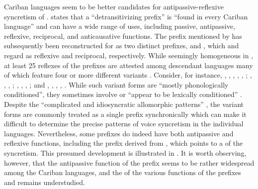 Cariban languages seem to be better candidates for antipassive-reflexive syncretism of . \cite[217ff.]{meira:2000} states that a “detransitivizing prefix” is “found in every Cariban language” and can have a wide range of uses, including passive, antipassive, reflexive, reciprocal, and anticausative functions. The prefix mentioned by \citeauthor{meira:2000} has subsequently been reconstructed for  as two distinct prefixes,  and , which \cite[512]{meira:al:2010} and \cite[9]{gildea:2015} regard as reflexive and reciprocal, respectively. While seemingly homogeneous in , at least 25 reflexes of the prefixes are attested among descendant languages many of which feature four or more different variants \citep[506]{meira:al:2010}. Consider, for instance,  , , , , , ;  , , , ;  , , , ; and  , , , ,  \citep[217f.]{meira:2000}. While such variant forms are “mostly phonologically conditioned”, they sometimes involve  \citep[2]{gildea:al:2016} or “appear to be lexically conditioned” \citep[217]{meira:2000}. Despite the “complicated and idiosyncratic allomorphic patterns” \citep[217]{meira:2000}, the variant forms are commonly treated as a single prefix synchronically which can make it difficult to determine the precise patterns of voice syncretism in the individual languages. Nevertheless, some prefixes do indeed have both antipassive and reflexive functions, including the prefix  derived from   \citep[511]{meira:al:2010}, which points to a  of the syncretism. This presumed development is illustrated in  \citep{meira:2000}. It is worth observing, however, that the antipassive function of the prefix  seems to be rather widespread among the Cariban languages, and the  of the various functions of the  prefixes  and  remains understudied.


